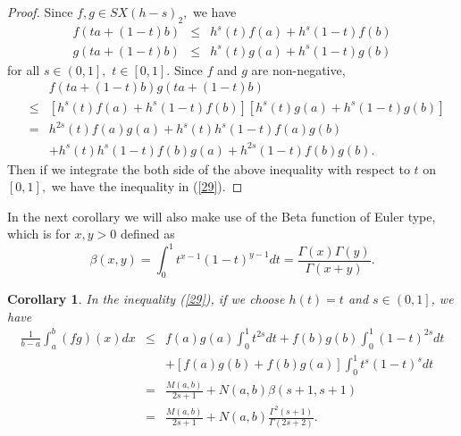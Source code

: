 \documentclass{amsart}
\theoremstyle{plain}
\newtheorem{corollary}{Corollary}
\numberwithin{equation}{section}
\begin{document}
\begin{proof}
Since $f,g\in SX(h-s)_{2},$ we have\begin{eqnarray*}
f\left( ta+\left( 1-t\right) b\right) &\leq &h^{s}\left( t\right) f\left(
a\right) +h^{s}\left( 1-t\right) f\left( b\right) \\
g\left( ta+(1-t)b\right) &\leq &h^{s}\left( t\right) g\left( a\right)
+h^{s}\left( 1-t\right) g\left( b\right)
\end{eqnarray*}for all $s\in \left( 0,1\right] ,$ $t\in \left[ 0,1\right] .$ Since $f$ and $g$ are non-negative,\begin{eqnarray*}
&&f\left( ta+\left( 1-t\right) b\right) g\left( ta+(1-t)b\right) \\
&\leq &\left[ h^{s}\left( t\right) f\left( a\right) +h^{s}\left( 1-t\right)
f\left( b\right) \right] \left[ h^{s}\left( t\right) g\left( a\right)
+h^{s}\left( 1-t\right) g\left( b\right) \right] \\
&=&h^{2s}\left( t\right) f\left( a\right) g\left( a\right) +h^{s}\left(
t\right) h^{s}\left( 1-t\right) f\left( a\right) g\left( b\right) \\
&&+h^{s}\left( t\right) h^{s}\left( 1-t\right) f\left( b\right) g\left(
a\right) +h^{2s}\left( 1-t\right) f\left( b\right) g\left( b\right) .
\end{eqnarray*}Then if we integrate the both side of the above inequality with respect to $t $ on $\left[ 0,1\right] ,$ we have the inequality in (\ref{29}).
\end{proof}

In the next corollary we will also make use of the Beta function of Euler
type, which is for $x,y>0$ defined as\begin{equation*}
\beta \left( x,y\right) =\int_{0}^{1}t^{x-1}\left( 1-t\right) ^{y-1}dt=\frac{\Gamma \left( x\right) \Gamma \left( y\right) }{\Gamma \left( x+y\right) }.
\end{equation*}

\begin{corollary}
\bigskip In the inequality (\ref{29}), \textit{if we choose }$h(t)=t$ and $s\in \left( 0,1\right] $\textit{, we have}\begin{eqnarray*}
\frac{1}{b-a}\int_{a}^{b}\left( fg\right) (x)dx &\leq &f\left( a\right)
g\left( a\right) \int_{0}^{1}t^{2s}dt+f\left( b\right) g\left( b\right)
\int_{0}^{1}\left( 1-t\right) ^{2s}dt \\
&&+\left[ f\left( a\right) g\left( b\right) +f\left( b\right) g\left(
a\right) \right] \int_{0}^{1}t^{s}\left( 1-t\right) ^{s}dt \\
&=&\frac{M\left( a,b\right) }{2s+1}+N\left( a,b\right) \beta \left(
s+1,s+1\right) \\
&=&\frac{M\left( a,b\right) }{2s+1}+N\left( a,b\right) \frac{\Gamma
^{2}\left( s+1\right) }{\Gamma \left( 2s+2\right) }.
\end{eqnarray*}
\end{corollary}
\end{document}

